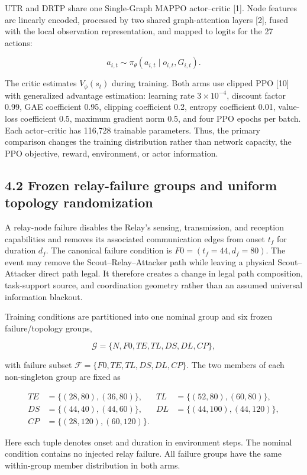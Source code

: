 UTR and DRTP share one Single-Graph MAPPO actor--critic [1]. Node features are linearly encoded, processed by two shared graph-attention layers [2], fused with the local observation representation, and mapped to logits for the 27 actions:

\[
a_{i,t}\sim\pi_\theta(a_{i,t}\mid o_{i,t},G_{i,t}).
\]

The critic estimates \(V_\phi(s_t)\) during training. Both arms use clipped PPO [10] with generalized advantage estimation: learning rate \(3\times10^{-4}\), discount factor 0.99, GAE coefficient 0.95, clipping coefficient 0.2, entropy coefficient 0.01, value-loss coefficient 0.5, maximum gradient norm 0.5, and four PPO epochs per batch. Each actor--critic has 116,728 trainable parameters. Thus, the primary comparison changes the training distribution rather than network capacity, the PPO objective, reward, environment, or actor information.

\subsection{4.2 Frozen relay-failure groups and uniform topology randomization}

A relay-node failure disables the Relay's sensing, transmission, and reception capabilities and removes its associated communication edges from onset \(t_f\) for duration \(d_f\). The canonical failure condition is \(F0=(t_f=44,d_f=80)\). The event may remove the Scout--Relay--Attacker path while leaving a physical Scout--Attacker direct path legal. It therefore creates a change in legal path composition, task-support source, and coordination geometry rather than an assumed universal information blackout.

Training conditions are partitioned into one nominal group and six frozen failure/topology groups,

\[
\mathcal G=\{N,F0,TE,TL,DS,DL,CP\},
\]

with failure subset \(\mathcal F=\{F0,TE,TL,DS,DL,CP\}\). The two members of each non-singleton group are fixed as

\[
\begin{aligned}
TE&=\{(28,80),(36,80)\}, & TL&=\{(52,80),(60,80)\},\\
DS&=\{(44,40),(44,60)\}, & DL&=\{(44,100),(44,120)\},\\
CP&=\{(28,120),(60,120)\}. &&
\end{aligned}
\]

Here each tuple denotes onset and duration in environment steps. The nominal condition contains no injected relay failure. All failure groups have the same within-group member distribution in both arms.

